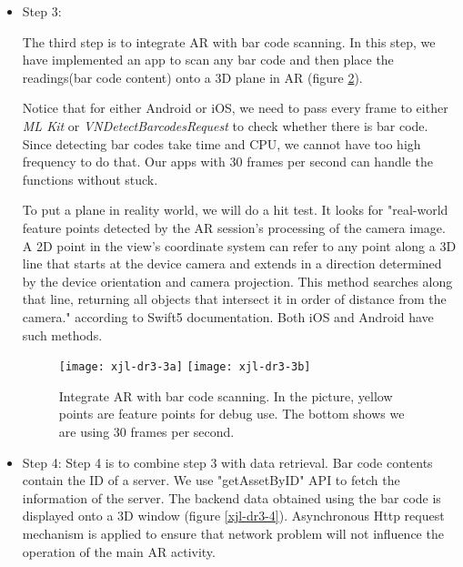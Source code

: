 \documentclass[11pt,a4paper]{article}
\begin{document}
\begin{onehalfspace}
\begin{itemize}
\begin{figure}[H]
	\centering
	\texttt{[image: xjl-dr3-2]}
	\caption{Test program for AR.}
	\label{xjl-dr3-2}
\end{figure}

\textbf{Scanning bar code} is a little bit tricky in Adroid. Since Android itself does not contain any bar code detection packages, we tried a lot of open source bar code detection services and decided to use \textit{ML Kit} for Android. For iOS, we can use the \textit{Vision} package with the \textit{VNDetectBarcodesRequest} class in it.

\item Step 3: 

The third step is to integrate AR with bar code scanning. In this step, we have implemented an app to scan any bar code and then place the readings(bar code content) onto a 3D plane in AR (figure \ref{xjl-dr3-3}). 

Notice that for either Android or iOS, we need to pass every frame to either \textit{ML Kit} or \textit{VNDetectBarcodesRequest} to check whether there is bar code. Since detecting bar codes take time and CPU, we cannot have too high frequency to do that. Our apps with 30 frames per second can handle the functions without stuck. 

To put a plane in reality world, we will do a hit test. It looks for "real-world feature points detected by the AR session's processing of the camera image. A 2D point in the view's coordinate system can refer to any point along a 3D line that starts at the device camera and extends in a direction determined by the device orientation and camera projection. This method searches along that line, returning all objects that intersect it in order of distance from the camera."\cite{zsy2} according to Swift5 documentation. Both iOS and Android have such methods.

\begin{figure}[H]
	\centering
	{\texttt{[image: xjl-dr3-3a]}}
	\hspace{2cm} %
	{\texttt{[image: xjl-dr3-3b]}}
	\caption{Integrate AR with bar code scanning. In the picture, yellow points are feature points for debug use. The bottom shows we are using 30 frames per second.}
	\label{xjl-dr3-3}
\end{figure}


\item Step 4: Step 4 is to combine step 3 with data retrieval. Bar code contents contain the ID of a server. We use "getAssetByID" API to fetch the information of the server. The backend data obtained using the bar code is displayed onto a 3D window (figure \ref{xjl-dr3-4}). Asynchronous Http request mechanism is applied to ensure that network problem will not influence the operation of the main AR activity.


\end{itemize}
\end{onehalfspace}
\end{document}
